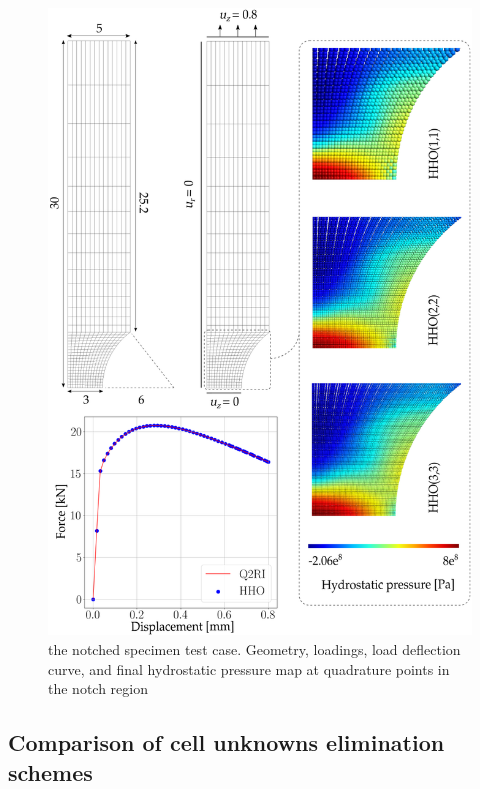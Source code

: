 \begin{figure}[H]
    \centering
    \includegraphics[width=12.cm]{../chapter_01_hho_mechanics/figures/ssna_mesh.png}
    \caption{
        the notched specimen test case. Geometry, loadings, load deflection curve, and final hydrostatic pressure map at quadrature points in the notch region
    }
    \label{fig_ssnaallmesh}
\end{figure}

\subsection{Comparison of cell unknowns elimination schemes}
\label{sec_num_example_part_2}

